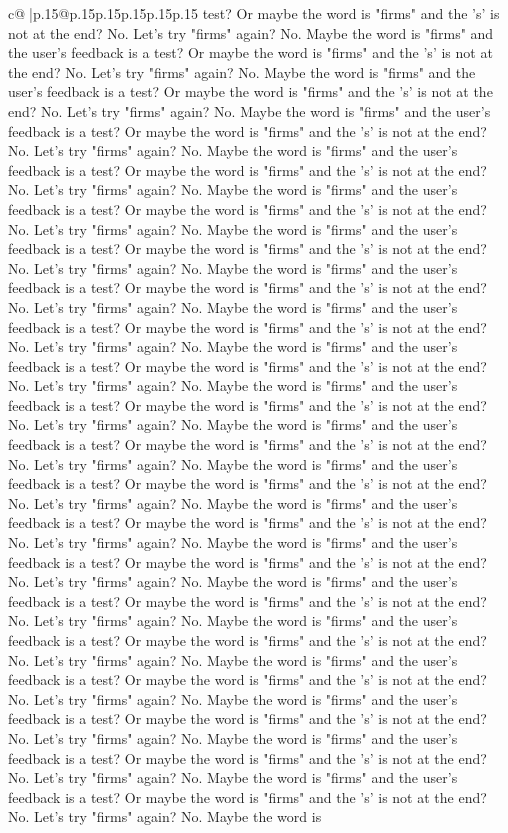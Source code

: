 \documentclass{article}
\begin{document}
{\begin{supertabular}{c@{$\;$}|p{.15\linewidth}@{}p{.15\linewidth}p{.15\linewidth}p{.15\linewidth}p{.15\linewidth}p{.15\linewidth}}
{{{test? Or maybe the word is "firms" and the 's' is not at the end? No. Let's try "firms" again? No. Maybe the word is "firms" and the user's feedback is a test? Or maybe the word is "firms" and the 's' is not at the end? No. Let's try "firms" again? No. Maybe the word is "firms" and the user's feedback is a test? Or maybe the word is "firms" and the 's' is not at the end? No. Let's try "firms" again? No. Maybe the word is "firms" and the user's feedback is a test? Or maybe the word is "firms" and the 's' is not at the end? No. Let's try "firms" again? No. Maybe the word is "firms" and the user's feedback is a test? Or maybe the word is "firms" and the 's' is not at the end? No. Let's try "firms" again? No. Maybe the word is "firms" and the user's feedback is a test? Or maybe the word is "firms" and the 's' is not at the end? No. Let's try "firms" again? No. Maybe the word is "firms" and the user's feedback is a test? Or maybe the word is "firms" and the 's' is not at the end? No. Let's try "firms" again? No. Maybe the word is "firms" and the user's feedback is a test? Or maybe the word is "firms" and the 's' is not at the end? No. Let's try "firms" again? No. Maybe the word is "firms" and the user's feedback is a test? Or maybe the word is "firms" and the 's' is not at the end? No. Let's try "firms" again? No. Maybe the word is "firms" and the user's feedback is a test? Or maybe the word is "firms" and the 's' is not at the end? No. Let's try "firms" again? No. Maybe the word is "firms" and the user's feedback is a test? Or maybe the word is "firms" and the 's' is not at the end? No. Let's try "firms" again? No. Maybe the word is "firms" and the user's feedback is a test? Or maybe the word is "firms" and the 's' is not at the end? No. Let's try "firms" again? No. Maybe the word is "firms" and the user's feedback is a test? Or maybe the word is "firms" and the 's' is not at the end? No. Let's try "firms" again? No. Maybe the word is "firms" and the user's feedback is a test? Or maybe the word is "firms" and the 's' is not at the end? No. Let's try "firms" again? No. Maybe the word is "firms" and the user's feedback is a test? Or maybe the word is "firms" and the 's' is not at the end? No. Let's try "firms" again? No. Maybe the word is "firms" and the user's feedback is a test? Or maybe the word is "firms" and the 's' is not at the end? No. Let's try "firms" again? No. Maybe the word is "firms" and the user's feedback is a test? Or maybe the word is "firms" and the 's' is not at the end? No. Let's try "firms" again? No. Maybe the word is "firms" and the user's feedback is a test? Or maybe the word is "firms" and the 's' is not at the end? No. Let's try "firms" again? No. Maybe the word is "firms" and the user's feedback is a test? Or maybe the word is "firms" and the 's' is not at the end? No. Let's try "firms" again? No. Maybe the word is "firms" and the user's feedback is a test? Or maybe the word is "firms" and the 's' is not at the end? No. Let's try "firms" again? No. Maybe the word is "firms" and the user's feedback is a test? Or maybe the word is "firms" and the 's' is not at the end? No. Let's try "firms" again? No. Maybe the word is }}}
\end{supertabular}}
\end{document}
